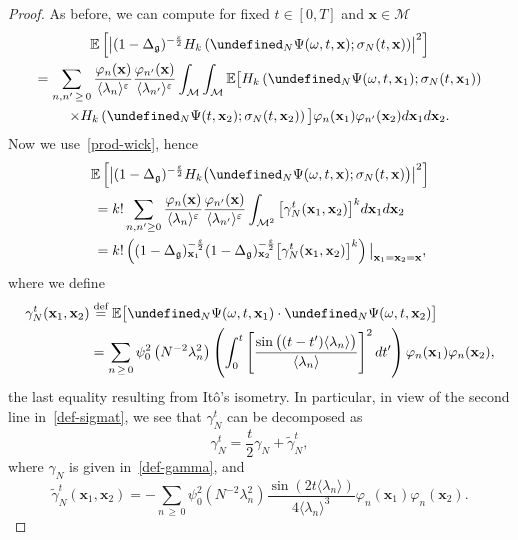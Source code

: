 \documentclass[10pt]{amsart}
\theoremstyle{definition}\newtheorem{defi}[theo]{Definition}\newtheorem{rema}[theo]{Remark}\newtheorem{exam}[theo]{Example}\newtheorem{exem}[theo]{Example}\newtheorem{nota}[theo]{Notation}
\newcommand{\E}{\mathbb{E}}
\newcommand{\deff}{\overset{\textup{def}}{=}}
\let\P= \undefined
\newcommand{\P}{\mathbf{P}}
\newcommand{\x}{\mathbf{x}}
\newcommand{\M}{\mathcal{M}}
\newcommand{\g}{\mathfrak{g}}
\newcommand{\Dlg}{\Delta_{\g}}
\newcommand{\eps}{\varepsilon}
\newcommand{\s}{\sigma}
\renewcommand{\o}{\omega}
\newcommand{\jb}[1] {\langle #1 \rangle}
\begin{document}
\begin{proof}
As before, we can compute for fixed $t\in [0,T]$ and $\x\in\M$
\begin{multline*}
\E\left[\left|(1-\Dlg)^{-\frac\eps2}H_k\left(\P_N\Psi(\o,t,\x);\s_N(t,\x)\right)\right|^2\right]\\
=\sum_{n,n'\,\geq\,0}\frac{\varphi_n(\x)}{\jb{\lambda_n}^{\eps}}\frac{\varphi_{n'}(\x)}{\jb{\lambda_{n'}}^{\eps}}\int_{\M}\int_{\M}\E\big[H_k\left(\P_N\Psi(\o,t,\x_1);\s_N(t,\x_1)\right)\\
\times H_k\left(\P_N\Psi(t,\x_2);\s_N(t,\x_2)\right)\big]\varphi_n(\x_1)\varphi_{n'}(\x_2)d\x_1d\x_2.
\end{multline*}
Now we use~\eqref{prod-wick}, hence
\begin{multline*}
\E\left[\left|(1-\Dlg)^{-\frac\eps2}H_k\big(\P_N\Psi(\o,t,\x);\s_N(t,\x)\big)\right|^2\right]\\
\begin{aligned}
&=k!\sum_{n,n'\geq 0}\frac{\varphi_n(\x)}{\jb{\lambda_n}^{\eps}}\frac{\varphi_{n'}(\x)}{\jb{\lambda_{n'}}^{\eps}}\int_{\M^2}\big[\gamma_N^t(\x_1,\x_2)\big]^kd\x_1d\x_2\\
&=k!\left((1-\Dlg)_{\x_1}^{-\frac\eps2}(1-\Dlg)_{\x_2}^{-\frac\eps2}\big[\gamma_N^t(\x_1,\x_2)\big]^k\right)\big|_{\x_1=\x_2=\x},
\end{aligned}
\end{multline*}
where we define
\begin{align*}
\gamma_N^t(\x_1,\x_2) &\deff  \E\big[\P_N\Psi(\o,t,\x_1)\cdot\P_N\Psi(\o,t,\x_2)\big]\\
&= \sum_{n\,\geq\,0}\psi_0^2\left(N^{-2}\lambda_n^2\right)\left(\int_0^t\left[\frac{\sin\big((t-t')\jb{\lambda_n}\big)}{\jb{\lambda_n}}\right]^2dt'\right)\varphi_n(\x_1)\varphi_n(\x_2),
\end{align*}
the last equality resulting from It\^o's isometry. In particular, in view of the second line in~\eqref{def-sigmat}, we see that $\gamma_N^t$ can be decomposed as
\begin{equation*}
\gamma_N^t = \frac{t}{2}\gamma_N + \widetilde{\gamma}_N^t,
\end{equation*}
where $\gamma_N$ is given in~\eqref{def-gamma}, and
\begin{equation*}
\widetilde{\gamma}_N^t(\x_1,\x_2) = -\sum_{n\,\geq\,0}\psi_0^2\left(N^{-2}\lambda_n^2\right)\frac{\sin\left(2t\jb{\lambda_n}\right)}{4\jb{\lambda_n}^3}\varphi_n(\x_1)\varphi_n(\x_2).
\end{equation*}


\end{proof}
\end{document}
